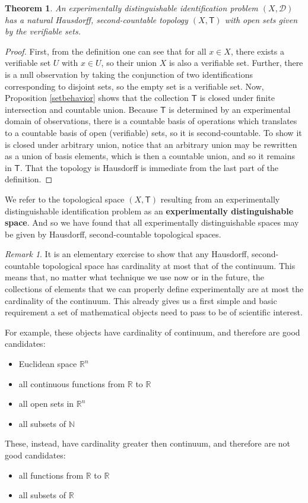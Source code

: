 \documentclass[review]{elsarticle}
\theoremstyle{plain}%
\newtheorem{thm}{Theorem}[section]
\theoremstyle{definition}
\theoremstyle{remark}
\newtheorem*{rem}{Remark}
\begin{document}
\begin{thm}
An experimentally distinguishable identification problem $(X,\mathcal{D})$ has a natural Hausdorff, second-countable topology $(X,\mathsf{T})$ with open sets given by the verifiable sets. 
\end{thm}
\begin{proof}
First, from the definition one can see that for all $x\in X$, there exists a verifiable set $U$ with $x\in U$, so their union $X$ is also a verifiable set. Further, there is a null observation by taking the conjunction of two identifications corresponding to disjoint sets, so the empty set is a verifiable set. Now, Proposition \ref{setbehavior} shows that the collection $\mathsf{T}$ is closed under finite intersection and countable union. Because $\mathsf{T}$ is determined by an experimental domain of observations, there is a countable basis of operations which translates to a countable basis of open (verifiable) sets, so it is second-countable. To show it is closed under arbitrary union, notice that an arbitrary union may be rewritten as a union of basis elements, which is then a countable union, and so it remains in $\mathsf{T}$. That the topology is Hausdorff is immediate from the last part of the definition. 
\end{proof}


We refer to the topological space $(X,\mathsf{T})$ resulting from an experimentally distinguishable identification problem as an \textbf{experimentally distinguishable space}. And so we have found that all experimentally distinguishable spaces may be given by Hausdorff, second-countable topological spaces. 


\begin{rem}
It is an elementary exercise to show that any Hausdorff, second-countable topological space has cardinality at most that of the continuum. This means that, no matter what technique we use now or in the future, the collections of elements that we can properly define experimentally are at most the cardinality of the continuum. This already gives us a first simple and basic requirement a set of mathematical objects need to pass to be of scientific interest.

For example, these objects have cardinality of continuum, and therefore are good candidates:
\begin{itemize}
	\item Euclidean space $\mathbb{R}^n$
	\item all continuous functions from $\mathbb{R}$ to $\mathbb{R}$
	\item all open sets in $\mathbb{R}^n$
	\item all subsets of $\mathbb{N}$
\end{itemize}

These, instead, have cardinality greater then continuum, and therefore are not good candidates:
\begin{itemize}
	\item all functions from $\mathbb{R}$ to $\mathbb{R}$
	\item all subsets of $\mathbb{R}$
\end{itemize}
\end{rem}
\end{document}
